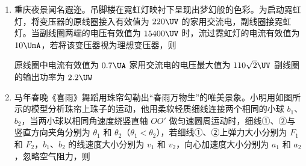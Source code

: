 \documentclass[\gkver]{gaokaozhenti}
\begin{document}
\begin{enumerate}
{B．光子能量 $E=hf$，厘米波频率更低，因此光子能量更小，故 B 错误；

C．所有电磁波在真空中的波速均为光速 $c$，与波长无关，二者波速相等，故 C 错误；

D．由 $v=\frac{c}{n}$，$n>1$ 可得介质中波速 $v<c$，即厘米波在真空中波速比介质中大，故 D 错误。

故选 A。
}
\item
重庆夜景闻名遐迩。吊脚楼在霓虹灯映衬下呈现出梦幻般的色彩。为启动霓虹灯，将变压器的原线圈接入有效值为 $220 \UV$ 的家用交流电，副线圈接霓虹灯。当副线圈两端的电压有效值为 $15400 \UV$ 时，流过霓虹灯的电流有效值为 $10 \UmA$，若将该变压器视为理想变压器，则 

{原线圈中电流有效值为 $0.7 \UA$}
{家用交流电的电压最大值为 $110\sqrt{2} \UV$}
{副线圈的输出功率为 $2.2 \UW$}


\item
马年春晚《喜雨》舞蹈用珠帘勾勒出“春雨万物生”的唯美景象。小明用如图所示的模型分析珠帘上珠子的运动，他用柔软轻质细线连接两个相同的小球 $b_{1}$、$b_{2}$，当两小球以相同角速度绕竖直轴 $OO'$ 做匀速圆周运动时，细线①、②与竖直方向夹角分别为 $\theta_{1}$ 和 $\theta_{2}$（$\theta_{1}<\theta_{2}$），若细线①、②上弹力大小分别为 $F_{1}$ 和 $F_{2}$，$b_{1}$、$b_{2}$ 的线速度大小分别为 $v_{1}$ 和 $v_{2}$，向心加速度大小分别为 $a_{1}$ 和 $a_{2}$，忽略空气阻力，则 


\end{enumerate}
\end{document}
